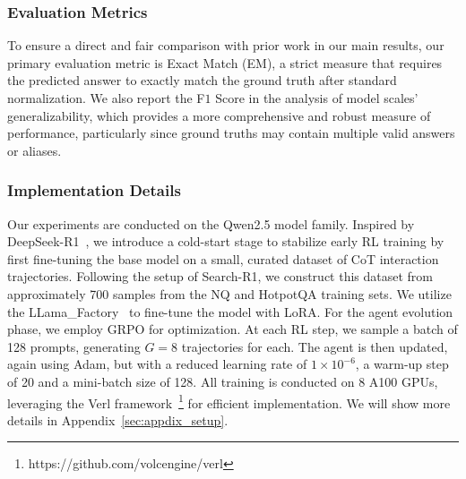 \subsubsection{Evaluation Metrics}

To ensure a direct and fair comparison with prior work in our main results, our primary evaluation metric is Exact Match (EM), a strict measure that requires the predicted answer to exactly match the ground truth after standard normalization. We also report the F$1$ Score in the analysis of model scales' generalizability, which provides a more comprehensive and robust measure of performance, particularly since ground truths may contain multiple valid answers or aliases.

\subsubsection{Implementation Details}


Our experiments are conducted on the Qwen2.5 model family. Inspired by DeepSeek-R1~\citep{guo2025deepseek}, we introduce a cold-start stage to stabilize early RL training by first fine-tuning the base model on a small, curated dataset of CoT interaction trajectories. Following the setup of Search-R1, we construct this dataset from approximately 700 samples from the NQ and HotpotQA training sets. 
We utilize the LLama\_Factory~\citep{zheng2024llamafactory} to fine-tune the model with LoRA. For the agent evolution phase, we employ GRPO for optimization. At each RL step, we sample a batch of 128 prompts, generating $G=8$ trajectories for each. The agent is then updated, again using Adam, but with a reduced learning rate of $1 \times 10^{-6}$, a warm-up step of 20 and a mini-batch size of 128. All training is conducted on 8 A100 GPUs, leveraging the Verl framework~\footnote{https://github.com/volcengine/verl} for efficient implementation. We will show more details in Appendix~\ref{sec:appdix_setup}. 


